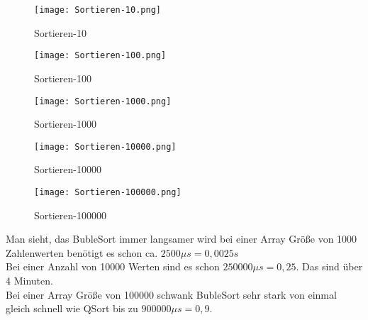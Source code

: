     \begin{figure}[!htb]
        \centering
        \texttt{[image: Sortieren-10.png]}
        \caption{Sortieren-10}
        \label{caption:Sortieren-10}
    \end{figure}
    
\newpage
    \begin{figure}[!htb]
        \centering
        \texttt{[image: Sortieren-100.png]}
        \caption{Sortieren-100}
        \label{caption:Sortieren-100}
    \end{figure}
    
    \begin{figure}[!htb]
        \centering
        \texttt{[image: Sortieren-1000.png]}
        \caption{Sortieren-1000}
        \label{caption:Sortieren-1000}
    \end{figure}
    
\newpage
    \begin{figure}[!htb]
        \centering
        \texttt{[image: Sortieren-10000.png]}
        \caption{Sortieren-10000}
        \label{caption:Sortieren-10000}
    \end{figure}
    
    \begin{figure}[!htb]
        \centering
        \texttt{[image: Sortieren-100000.png]}
        \caption{Sortieren-100000}
        \label{caption:Sortieren-100000}
    \end{figure}
    
\newpage
    \noindent Man sieht, das BubleSort immer langsamer wird bei einer Array Größe von 1000 Zahlenwerten benötigt es schon ca. $2500\mu s = 0,0025s$\\
    Bei einer Anzahl von 10000 Werten sind es schon $250000\mu s = 0,25$. Das sind über 4 Minuten.\\
    Bei einer Array Größe von 100000 schwank BubleSort sehr stark von einmal gleich schnell wie QSort bis zu $900000\mu s = 0,9$.